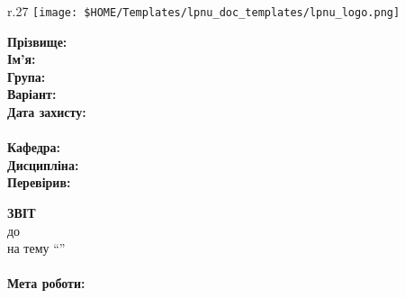 \Margins
\begin{wrapfigure}[3]{r}{.27\textwidth}
\texttt{[image: \$HOME/Templates/lpnu\_doc\_templates/lpnu\_logo.png]}
\end{wrapfigure}

\noindent\textbf{Прізвище:} \Lname \\
\noindent\textbf{Ім'я:} \Fname \\
\noindent\textbf{Група:} \Group \\
\noindent\textbf{Варіант:} \Variant \\
\noindent\textbf{Дата захисту:} \Date \\
\\
\noindent\textbf{Кафедра:} \Department \\
\noindent\textbf{Дисципліна:} \Discipline \\
\noindent\textbf{Перевірив:} \Instructor \\


\begin{center}
	\textbf{ЗВІТ}		\\
	до \Type~\No\Number	\\
	на тему ``\Topic''	\\
\end{center}
\paragraph{Мета роботи:}
